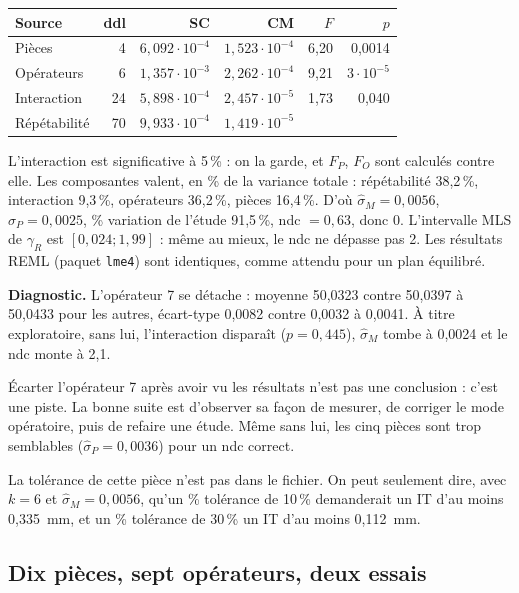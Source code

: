 \documentclass[11pt,a4paper]{article}
\theoremstyle{sj}
\theoremstyle{definition}
\theoremstyle{remark}
\newcommand{\gR}{\gamma_R}
\begin{document}
\begin{center}
\begin{tabular}{l r r r r r}
\toprule
Source & ddl & SC & CM & $F$ & $p$\\
\midrule
Pièces & 4 & $6{,}092\cdot10^{-4}$ & $1{,}523\cdot10^{-4}$ & 6,20 & 0,0014\\
Opérateurs & 6 & $1{,}357\cdot10^{-3}$ & $2{,}262\cdot10^{-4}$ & 9,21 & $3\cdot10^{-5}$\\
Interaction & 24 & $5{,}898\cdot10^{-4}$ & $2{,}457\cdot10^{-5}$ & 1,73 & 0,040\\
Répétabilité & 70 & $9{,}933\cdot10^{-4}$ & $1{,}419\cdot10^{-5}$ & &\\
\bottomrule
\end{tabular}
\end{center}

L'interaction est significative à 5\,\% : on la garde, et $F_P$, $F_O$ sont calculés contre elle. Les composantes valent, en \% de la variance totale : répétabilité 38,2\,\%, interaction 9,3\,\%, opérateurs 36,2\,\%, pièces 16,4\,\%. D'où $\hat\sigma_M=0{,}0056$, $\hat\sigma_P=0{,}0025$, \% variation de l'étude 91,5\,\%, ndc $=0{,}63$, donc 0. L'intervalle MLS de $\gR$ est $[0{,}024;1{,}99]$ : même au mieux, le ndc ne dépasse pas 2. Les résultats REML (paquet \texttt{lme4}) sont identiques, comme attendu pour un plan équilibré.

\textbf{Diagnostic.} L'opérateur 7 se détache : moyenne 50,0323 contre 50,0397 à 50,0433 pour les autres, écart-type 0,0082 contre 0,0032 à 0,0041. À titre exploratoire, sans lui, l'interaction disparaît ($p=0{,}445$), $\hat\sigma_M$ tombe à 0,0024 et le ndc monte à 2,1.

\begin{attention}
Écarter l'opérateur 7 après avoir vu les résultats n'est pas une conclusion : c'est une piste. La bonne suite est d'observer sa façon de mesurer, de corriger le mode opératoire, puis de refaire une étude. Même sans lui, les cinq pièces sont trop semblables ($\hat\sigma_P=0{,}0036$) pour un ndc correct.
\end{attention}

La tolérance de cette pièce n'est pas dans le fichier. On peut seulement dire, avec $k=6$ et $\hat\sigma_M=0{,}0056$, qu'un \% tolérance de 10\,\% demanderait un IT d'au moins 0,335~mm, et un \% tolérance de 30\,\% un IT d'au moins 0,112~mm.

\subsection{Dix pièces, sept opérateurs, deux essais}
\end{document}
